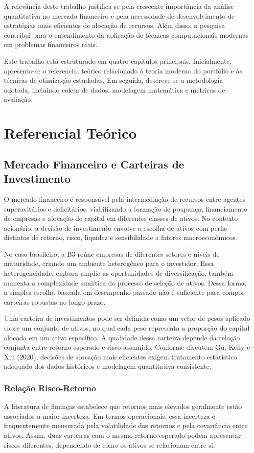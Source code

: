 \documentclass[
  12pt,
  oneside,
  a4paper,
  brazil
]{abntex2}
\begin{document}
A relevância deste trabalho justifica-se pela crescente importância da análise quantitativa no mercado financeiro e pela necessidade de desenvolvimento de estratégias mais eficientes de alocação de recursos. Além disso, a pesquisa contribui para o entendimento da aplicação de técnicas computacionais modernas em problemas financeiros reais.

Este trabalho está estruturado em quatro capítulos principais. Inicialmente, apresenta-se o referencial teórico relacionado à teoria moderna do portfólio e às técnicas de otimização estudadas. Em seguida, descreve-se a metodologia adotada, incluindo coleta de dados, modelagem matemática e métricas de avaliação.

\chapter{Referencial Teórico}
\section{Mercado Financeiro e Carteiras de Investimento}
O mercado financeiro é responsável pela intermediação de recursos entre agentes superavitários e deficitários, viabilizando a formação de poupança, financiamento de empresas e alocação de capital em diferentes classes de ativos. No contexto acionário, a decisão de investimento envolve a escolha de ativos com perfis distintos de retorno, risco, liquidez e sensibilidade a fatores macroeconômicos.

No caso brasileiro, a B3 reúne empresas de diferentes setores e níveis de maturidade, criando um ambiente heterogêneo para o investidor. Essa heterogeneidade, embora amplie as oportunidades de diversificação, também aumenta a complexidade analítica do processo de seleção de ativos. Dessa forma, a simples escolha baseada em desempenho passado não é suficiente para compor carteiras robustas no longo prazo.

Uma carteira de investimentos pode ser definida como um vetor de pesos aplicado sobre um conjunto de ativos, no qual cada peso representa a proporção do capital alocada em um ativo específico. A qualidade dessa carteira depende da relação conjunta entre retorno esperado e risco assumido. Conforme discutem Gu, Kelly e Xiu (2020), decisões de alocação mais eficientes exigem tratamento estatístico adequado dos dados históricos e modelagem quantitativa consistente.

\subsection{Relação Risco-Retorno}
A literatura de finanças estabelece que retornos mais elevados geralmente estão associados a maior incerteza. Em termos operacionais, essa incerteza é frequentemente mensurada pela volatilidade dos retornos e pela covariância entre ativos. Assim, duas carteiras com o mesmo retorno esperado podem apresentar riscos diferentes, dependendo de como os ativos se relacionam entre si.
\end{document}
